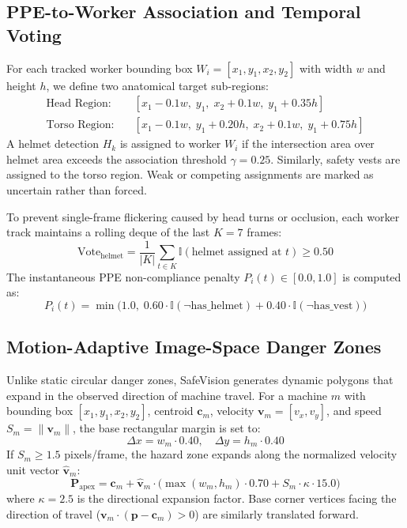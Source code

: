 \documentclass[letterpaper, 10 pt, conference]{ieeeconf}
\begin{document}
\subsection{PPE-to-Worker Association and Temporal Voting}
For each tracked worker bounding box $W_i = [x_{1}, y_{1}, x_{2}, y_{2}]$ with width $w$ and height $h$, we define two anatomical target sub-regions:
\begin{align}
\text{Head Region:} \quad & [x_1 - 0.1w, \; y_1, \; x_2 + 0.1w, \; y_1 + 0.35h] \\
\text{Torso Region:} \quad & [x_1 - 0.1w, \; y_1 + 0.20h, \; x_2 + 0.1w, \; y_1 + 0.75h]
\end{align}
A helmet detection $H_k$ is assigned to worker $W_i$ if the intersection area over helmet area exceeds the association threshold $\gamma = 0.25$. Similarly, safety vests are assigned to the torso region. Weak or competing assignments are marked as uncertain rather than forced.

To prevent single-frame flickering caused by head turns or occlusion, each worker track maintains a rolling deque of the last $K = 7$ frames:
\begin{equation}
\text{Vote}_{\text{helmet}} = \frac{1}{|K|} \sum_{t \in K} \mathbb{I}(\text{helmet assigned at } t) \ge 0.50
\end{equation}
The instantaneous PPE non-compliance penalty $P_i(t) \in [0.0, 1.0]$ is computed as:
\begin{equation}
P_i(t) = \min\Big(1.0, \; 0.60 \cdot \mathbb{I}(\neg \text{has\_helmet}) + 0.40 \cdot \mathbb{I}(\neg \text{has\_vest})\Big)
\end{equation}

\subsection{Motion-Adaptive Image-Space Danger Zones}
Unlike static circular danger zones, SafeVision generates dynamic polygons that expand in the observed direction of machine travel. For a machine $m$ with bounding box $[x_1, y_1, x_2, y_2]$, centroid $\mathbf{c}_m$, velocity $\mathbf{v}_m = [v_x, v_y]$, and speed $S_m = \|\mathbf{v}_m\|$, the base rectangular margin is set to:
\begin{equation}
\Delta x = w_m \cdot 0.40, \quad \Delta y = h_m \cdot 0.40
\end{equation}
If $S_m \ge 1.5$ pixels/frame, the hazard zone expands along the normalized velocity unit vector $\hat{\mathbf{v}}_m$:
\begin{equation}
\mathbf{P}_{\text{apex}} = \mathbf{c}_m + \hat{\mathbf{v}}_m \cdot \Big(\max(w_m, h_m) \cdot 0.70 + S_m \cdot \kappa \cdot 15.0\Big)
\end{equation}
where $\kappa = 2.5$ is the directional expansion factor. Base corner vertices facing the direction of travel ($\mathbf{v}_m \cdot (\mathbf{p} - \mathbf{c}_m) > 0$) are similarly translated forward.
\end{document}
